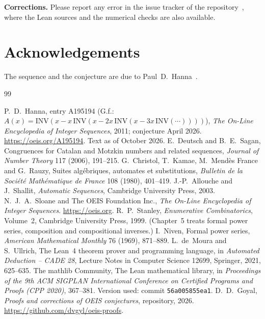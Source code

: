 \documentclass[11pt,a4paper]{article}
\theoremstyle{definition}
\theoremstyle{remark}
\newcommand{\para}[1]{\par\medskip\noindent\textbf{#1}\enspace}
\begin{document}
\para{Corrections.} Please report any error in the issue tracker of the repository~\cite{repo}, where the Lean sources and the numerical checks are also
available.

\section*{Acknowledgements}
The sequence and the conjecture are due to Paul~D.~Hanna~\cite{oeis}.

\begin{thebibliography}{99}\small
\raggedright
{} P.~D.~Hanna, entry A195194 (G.f.: $A(x)=\mathrm{INV}(x-x\,\mathrm{INV}(x-2x\,\mathrm{INV}(x-3x\,\mathrm{INV}(\cdots))))$), \emph{The On-Line Encyclopedia of Integer Sequences}, 2011; conjecture April 2026. \url{https://oeis.org/A195194}. Text as of October 2026.
 E.~Deutsch and B.~E.~Sagan, Congruences for Catalan and Motzkin numbers and related sequences, \emph{Journal of Number Theory} 117 (2006), 191--215.
 G.~Christol, T.~Kamae, M.~Mend\`es France and G.~Rauzy, Suites alg\'ebriques, automates et substitutions, \emph{Bulletin de la Soci\'et\'e Math\'ematique de France} 108 (1980), 401--419.
 J.-P.~Allouche and J.~Shallit, \emph{Automatic Sequences}, Cambridge University Press, 2003.
 N.~J.~A.~Sloane and The OEIS Foundation Inc., \emph{The On-Line Encyclopedia of Integer Sequences}. \url{https://oeis.org}.
 R.~P.~Stanley, \emph{Enumerative Combinatorics}, Volume~2, Cambridge University Press, 1999. (Chapter~5 treats formal power series, composition and compositional inverses.)
 I.~Niven, Formal power series, \emph{American Mathematical Monthly} 76 (1969), 871--889.
 L.~de~Moura and S.~Ullrich, The Lean~4 theorem prover and programming language, in \emph{Automated Deduction -- CADE 28}, Lecture Notes in Computer Science 12699, Springer, 2021, 625--635.
 The mathlib Community, The Lean mathematical library, in \emph{Proceedings of the 9th ACM SIGPLAN International Conference on Certified Programs and Proofs (CPP 2020)}, 367--381. Version used: commit \texttt{56a005855ea1}.
 D.~D.~Goyal, \emph{Proofs and corrections of OEIS conjectures}, repository, 2026. \url{https://github.com/dvgyl/oeis-proofs}.
\end{thebibliography}
\end{document}
